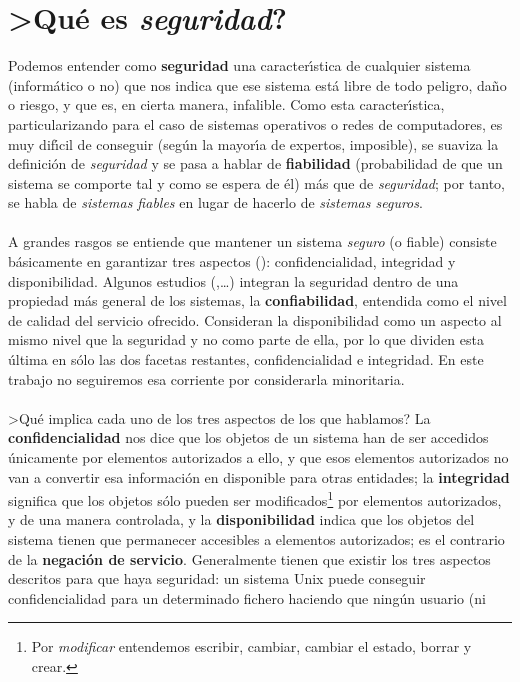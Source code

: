\section{>Qu\'e es {\it seguridad}?}
Podemos entender como {\bf seguridad} una caracter\'{\i}stica de cualquier 
sistema (inform\'atico o no) que nos indica que ese sistema est\'a libre de 
todo peligro, da\~no o riesgo, y que es, en cierta manera, infalible. Como 
esta caracter\'{\i}stica, particularizando para el caso de sistemas operativos
o redes de computadores, es muy dif\'{\i}cil de conseguir (seg\'un la 
mayor\'{\i}a de expertos, imposible), se suaviza la definici\'on de {\it 
seguridad} y se pasa a hablar de {\bf fiabilidad} (probabilidad de que un 
sistema se comporte tal y como se espera de \'el) m\'as 
que de {\it seguridad}; por tanto, se habla de {\it sistemas fiables} en lugar 
de hacerlo de {\it sistemas seguros}.\\
\\A grandes rasgos se entiende que mantener un sistema {\it seguro} (o 
fiable) consiste b\'asicamente en garantizar tres aspectos (\cite{kn:pfl97}):
confidencialidad, integridad y disponibilidad. Algunos estudios 
(\cite{kn:lap91},\cite{kn:olo92}\ldots) integran la seguridad dentro de una
propiedad m\'as general de los sistemas, la {\bf confiabilidad}, entendida como
el nivel de calidad del servicio ofrecido. Consideran la disponibilidad como 
un aspecto al mismo nivel que la seguridad y no como parte de ella, por lo que 
dividen esta \'ultima en s\'olo las dos facetas restantes, confidencialidad e 
integridad. En este trabajo no seguiremos esa corriente por considerarla 
minoritaria.\\
\\>Qu\'e implica cada uno de los tres aspectos de los que hablamos? La {\bf
confidencialidad} nos dice que los objetos de un sistema han de ser accedidos 
\'unicamente por elementos autorizados a ello, y que esos elementos autorizados
no van a convertir esa informaci\'on en disponible para otras entidades; la 
{\bf integridad} significa que los objetos s\'olo pueden ser 
modificados\footnote{Por {\it modificar} entendemos escribir, cambiar, cambiar
el estado, borrar y crear.} por elementos autorizados, y de una manera 
controlada, y la {\bf disponibilidad} indica que los objetos del sistema tienen 
que permanecer accesibles a elementos autorizados; es el contrario de la 
{\bf negaci\'on de servicio}. Ge\-ne\-ral\-men\-te tienen que existir los tres 
aspectos
descritos para que haya seguridad: un sistema Unix puede conseguir
confidencialidad para un determinado fichero haciendo que ning\'un usuario (ni
